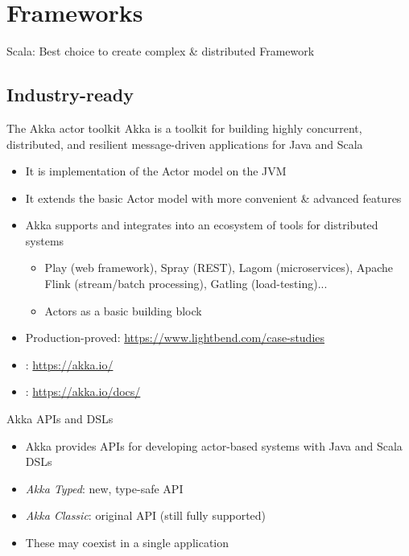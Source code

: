 \documentclass[presentation, 9pt]{beamer}\mode<presentation>{\usetheme{AMSBolognaFC}}
\begin{document}
\section{Frameworks}
\begin{frame}{Scala: Best choice to create complex \& distributed Framework}
	
\end{frame}
\subsection{Industry-ready}
\begin{frame}[c]{The Akka actor toolkit}
Akka is a toolkit for building highly concurrent, distributed, and resilient
message-driven applications for Java and Scala
\begin{itemize}
	\item It is  implementation of the Actor model on the JVM
	\item It extends the basic Actor model with more convenient \& advanced features
	\item Akka supports and integrates into an ecosystem of tools for distributed systems
 \begin{itemize}
		\item Play (web framework), Spray (REST), Lagom (microservices), Apache Flink (stream/batch
		processing), Gatling (load-testing)...
		\item Actors as a basic building block
 \end{itemize}
 \item Production-proved: \url{https://www.lightbend.com/case-studies}
 \item {}: \url{https://akka.io/}
 \item {}: \url{https://akka.io/docs/}
\end{itemize}
\begin{alertblock}{Akka APIs and DSLs \href{https://doc.akka.io/docs/akka/current/typed/from-classic.html}{\faLink}}
	\begin{itemize}
		\item Akka provides APIs for developing actor-based systems with Java and Scala DSLs
		\item \emph{Akka Typed}: new, type-safe API
		\item \emph{Akka Classic}: original API (still fully supported)
		\item These may coexist in a single application
	\end{itemize}
\end{alertblock}
\end{frame}
\end{document}
